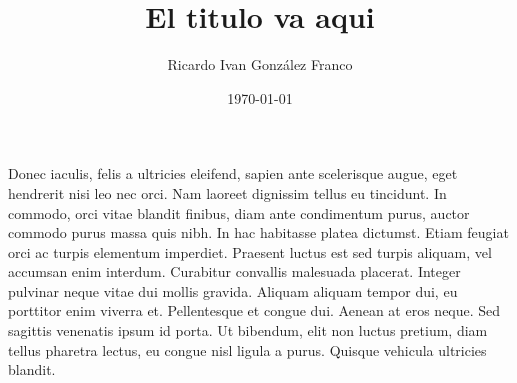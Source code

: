 \documentclass[spanish,mexico]{article}
\title{El titulo va aqui}
\author{Ricardo Ivan González Franco}
\date{\today}
\numberwithin{equation}{section}
\theoremstyle{definition}
\theoremstyle{remark}
\begin{document}
\maketitle

Donec iaculis, felis a ultricies eleifend, sapien ante scelerisque augue, eget hendrerit nisi leo nec orci. Nam laoreet dignissim tellus eu tincidunt. In commodo, orci vitae blandit finibus, diam ante condimentum purus, auctor commodo purus massa quis nibh. In hac habitasse platea dictumst. Etiam feugiat orci ac turpis elementum imperdiet. Praesent luctus est sed turpis aliquam, vel accumsan enim interdum. Curabitur convallis malesuada placerat. Integer pulvinar neque vitae dui mollis gravida. Aliquam aliquam tempor dui, eu porttitor enim viverra et. Pellentesque et congue dui. Aenean at eros neque. Sed sagittis venenatis ipsum id porta. Ut bibendum, elit non luctus pretium, diam tellus pharetra lectus, eu congue nisl ligula a purus. Quisque vehicula ultricies blandit. 
\end{document}
